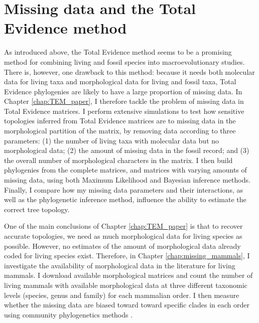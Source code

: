 %
%


\section{Missing data and the Total Evidence method}
As introduced above, the Total Evidence method seems to be a promising method for combining living and fossil species into macroevolutionary studies.
There is, however, one drawback to this method: because it needs both molecular data for living taxa and morphological data for living and fossil taxa, Total Evidence phylogenies are likely to have a large proportion of missing data.
In Chapter \ref{chap:TEM_paper}, I therefore tackle the problem of missing data in Total Evidence matrices.
I perform extensive simulations to test how sensitive topologies inferred from Total Evidence matrices are to missing data in the morphological partition of the matrix, by removing data according to three parameters: (1) the number of living taxa with molecular data but no morphological data; (2) the amount of missing data in the fossil record; and (3) the overall number of morphological characters in the matrix.
I then build phylogenies from the complete matrices, and matrices with varying amounts of missing data, using both Maximum Likelihood and Bayesian inference methods.
Finally, I compare how my missing data parameters and their interactions, as well as the phylogenetic inference method, influence the ability to estimate the correct tree topology.

One of the main conclusions of Chapter \ref{chap:TEM_paper} is that to recover accurate topologies, we need as much morphological data for living species as possible.
However, no estimates of the amount of morphological data already coded for living species exist.
Therefore, in Chapter \ref{chap:missing_mammals}, I investigate the availability of morphological data in the literature for living mammals.
I download available morphological matrices and count the number of living mammals with available morphological data at three different taxonomic levels (species, genus and family) for each mammalian order.
I then measure whether the missing data are biased toward toward specific clades in each order using community phylogenetics methods \citep{webb2002phylogenies}.


